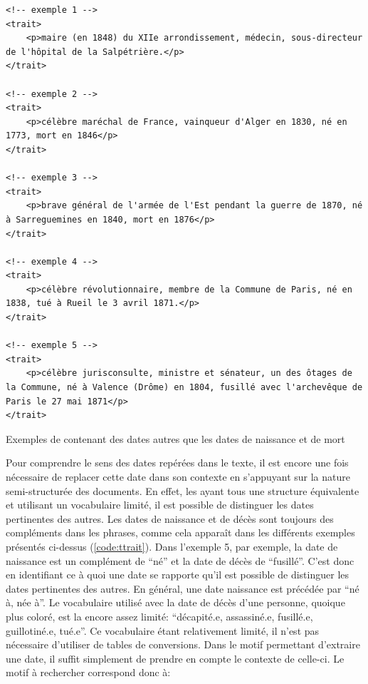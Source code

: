 \begin{listing}[h!]
	\begin{verbatim}
<!-- exemple 1 -->
<trait>
	<p>maire (en 1848) du XIIe arrondissement, médecin, sous-directeur de l'hôpital de la Salpétrière.</p>
</trait>

<!-- exemple 2 -->
<trait>
	<p>célèbre maréchal de France, vainqueur d'Alger en 1830, né en 1773, mort en 1846</p>
</trait>

<!-- exemple 3 -->
<trait>
	<p>brave général de l'armée de l'Est pendant la guerre de 1870, né à Sarreguemines en 1840, mort en 1876</p>
</trait>

<!-- exemple 4 -->
<trait>
	<p>célèbre révolutionnaire, membre de la Commune de Paris, né en 1838, tué à Rueil le 3 avril 1871.</p>
</trait>

<!-- exemple 5 -->
<trait>
	<p>célèbre jurisconsulte, ministre et sénateur, un des ôtages de la Commune, né à Valence (Drôme) en 1804, fusillé avec l'archevêque de Paris le 27 mai 1871</p>
</trait>
	\end{verbatim}
	\caption{Exemples de \ttrait{} contenant des dates autres que les dates de naissance et de mort}
	\label{code:ttrait}
\end{listing}

Pour comprendre le sens des dates repérées dans le texte, il est encore une fois nécessaire de replacer cette date dans son contexte en s'appuyant sur la nature semi-structurée des documents. En effet, les \ttrait{} ayant tous une structure équivalente et utilisant un vocabulaire limité, il est possible de distinguer les dates pertinentes des autres. Les dates de naissance et de décès sont toujours des compléments dans les phrases, comme cela apparaît dans les différents exemples présentés ci-dessus (\ref{code:ttrait}). Dans l'exemple 5, par exemple, la date de naissance est un complément de \enquote{né} et la date de décès de \enquote{fusillé}. C'est donc en identifiant ce à quoi une date se rapporte qu'il est possible de distinguer les dates pertinentes des autres. En général, une date naissance est précédée par \enquote{né à, née à}. Le vocabulaire utilisé avec la date de décès d'une personne, quoique plus coloré, est la encore assez limité: \enquote{décapité.e, assassiné.e, fusillé.e, guillotiné.e, tué.e}. Ce vocabulaire étant relativement limité, il n'est pas nécessaire d'utiliser de tables de conversions. Dans le motif permettant d'extraire une date, il suffit simplement de prendre en compte le contexte de celle-ci. Le motif à rechercher correspond donc à:

